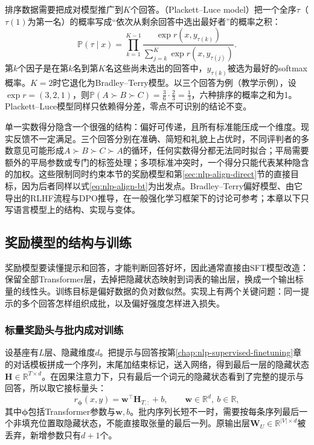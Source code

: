 排序数据需要把成对模型推广到$K$个回答。（Plackett--Luce model）把一个全序$\tau$（$\tau(1)$为第一名）的概率写成“依次从剩余回答中选出最好者”的概率之积\cite{nlp-align-plackett1975,nlp-align-luce1959}：
\begin{equation}
\label{eq:nlp-align-plackett-luce}
 \mathbb P(\tau\mid x)=\prod_{k=1}^{K-1}
 \frac{\exp r(x,y_{\tau(k)})}{\sum_{j=k}^{K}\exp r(x,y_{\tau(j)})}.
\end{equation}
第$k$个因子是在第$k$名到第$K$名这些尚未选出的回答中，$y_{\tau(k)}$被选为最好的softmax概率。$K=2$时它退化为Bradley--Terry模型。以三个回答为例（教学示例），设$\exp r=(3,2,1)$，则$\mathbb P(A\succ B\succ C)=\frac{3}{6}\cdot\frac{2}{3}=\frac13$，六种排序的概率之和为1。Plackett--Luce模型同样只依赖得分差，零点不可识别的结论不变。

单一实数得分隐含一个很强的结构：偏好可传递，且所有标准能压成一个维度。现实反馈不一定满足。三个回答分别在准确、简短和礼貌上占优时，不同评判者的多数意见可能形成$A\succ B\succ C\succ A$的循环，任何实数得分都无法同时拟合；平局需要额外的平局参数或专门的标签处理；多项标准冲突时，一个得分只能代表某种隐含的加权。这些限制同时约束本节的奖励模型和第\ref{sec:nlp-align-direct}节的直接目标，因为后者同样以式\eqref{eq:nlp-align-bt}为出发点。Bradley--Terry偏好模型、由它导出的RLHF流程与DPO推导，在一般强化学习框架下的讨论可参考；本章以下只写语言模型上的结构、实现与变体。

\subsection{奖励模型的结构与训练}
\label{sec:nlp-align-reward-model}

奖励模型要读懂提示和回答，才能判断回答好坏，因此通常直接由SFT模型改造：保留全部Transformer层，去掉把隐藏状态映射到词表的输出层，换成一个输出标量的线性头。训练目标是偏好数据的负对数似然。实现上有两个关键问题：同一提示的多个回答怎样组织成批，以及偏好强度怎样进入损失。

\subsubsection{标量奖励头与批内成对训练}
\label{sec:nlp-align-rm-head}

设基座有$L$层、隐藏维度$d$。把提示与回答按第\ref{chap:nlp-supervised-finetuning}章的对话模板拼成一个序列，末尾加结束标记，送入网络，得到最后一层的隐藏状态$\bm H\in\mathbb R^{T\times d}$。在因果注意力下，只有最后一个词元的隐藏状态看到了完整的提示与回答，所以取它接标量头：
\begin{equation}
\label{eq:nlp-align-rm-head}
 r_{\bm\phi}(x,y)=\bm w^{\top}\bm H_{T,:}+b,\qquad \bm w\in\mathbb R^{d},\ b\in\mathbb R,
\end{equation}
其中$\bm\phi$包括Transformer参数与$\bm w,b$。批内序列长短不一时，需要按每条序列最后一个非填充位置取隐藏状态，不能直接取张量的最后一列。原输出层$\bm W_U\in\mathbb R^{|V|\times d}$被丢弃，新增参数只有$d+1$个。

